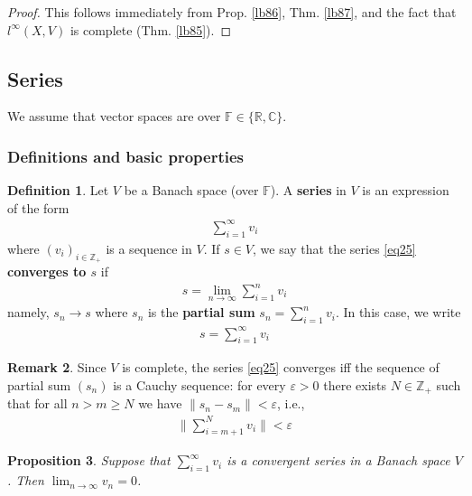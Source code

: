 \documentclass[12pt,b5paper,notitlepage]{article}
\theoremstyle{definition}
\newtheorem{df}{Definition}[section]
\newtheorem{rem}[df]{Remark}
\theoremstyle{plain}
\newtheorem{pp}[df]{Proposition}
\newcommand{\Cbb}{\mathbb C}
\newcommand{\Zbb}{\mathbb Z}
\newcommand{\Rbb}{\mathbb R}
\newcommand{\Fbb}{\mathbb F}
\newcommand{\dps}{\displaystyle}
\newcommand{\eps}{\varepsilon}
\numberwithin{equation}{section}
\begin{document}
\begin{proof}
This follows immediately from Prop. \ref{lb86}, Thm. \ref{lb87}, and the fact that $l^\infty(X,V)$ is complete (Thm. \ref{lb85}).
\end{proof}


\subsection{Series}

We assume that vector spaces are over $\Fbb\in\{\Rbb,\Cbb\}$.

\subsubsection{Definitions and basic properties}


\begin{df}
Let $V$ be a Banach space (over $\Fbb$). A \textbf{series}  in $V$ is an expression of the form
\begin{align}
\sum_{i=1}^\infty v_i  \label{eq25}
\end{align}
where $(v_i)_{i\in\Zbb_+}$ is a sequence in $V$. If $s\in V$, we say that the series \eqref{eq25} \textbf{converges to $s$} if
\begin{align*}
s=\lim_{n\rightarrow\infty} \sum_{i=1}^n v_i
\end{align*}
namely, $s_n\rightarrow s$ where $s_n$ is the \textbf{partial sum}  $s_n=\sum_{i=1}^n v_i$. In this case, we write
\begin{align*}
s=\sum_{i=1}^\infty v_i
\end{align*}
\end{df}


\begin{rem}
Since $V$ is complete, the series \eqref{eq25} converges iff the sequence of partial sum $(s_n)$ is a Cauchy sequence: for every $\eps>0$ there exists $N\in\Zbb_+$ such that for all $n> m\geq N$ we have $\lVert s_n-s_m\lVert<\eps$, i.e.,
\begin{align}
\Big\lVert \sum_{i=m+1}^N v_i\Big\lVert<\eps  \label{eq28}
\end{align}
\end{rem}


\begin{pp}
Suppose that $\sum_{i=1}^\infty v_i$ is a convergent series in a Banach space $V$. Then $\dps\lim_{n\rightarrow\infty} v_n=0$.
\end{pp}
\end{document}
